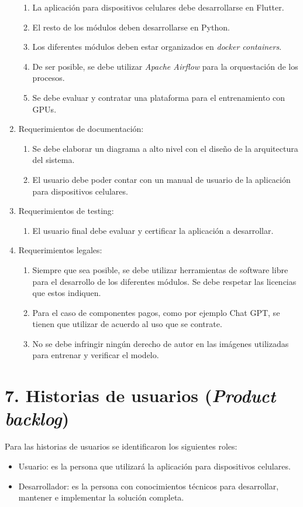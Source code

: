 \documentclass[
11pt, %
]{charter}
\begin{document}
\begin{enumerate}
\begin{enumerate}
			\item La aplicación para dispositivos celulares debe desarrollarse en Flutter.
			\item El resto de los módulos deben desarrollarse en Python.
			\item Los diferentes módulos deben estar organizados en \textit{docker containers}.
			\item De ser posible, se debe utilizar \textit{Apache Airflow} para la orquestación de los procesos.
			\item Se debe evaluar y contratar una plataforma para el entrenamiento con GPUs.
		\end{enumerate}
	\item Requerimientos de documentación:
		\begin{enumerate}
			\item Se debe elaborar un diagrama a alto nivel con el diseño de la arquitectura del sistema.
			\item El usuario debe poder contar con un manual de usuario de la aplicación para dispositivos celulares.
		\end{enumerate}
	\item Requerimientos de testing:
		\begin{enumerate}
			\item El usuario final debe evaluar y certificar la aplicación a desarrollar.
		\end{enumerate}
	\item Requerimientos legales:
		\begin{enumerate}
			\item Siempre que sea posible, se debe utilizar herramientas de software libre para el desarrollo de los diferentes módulos. Se debe respetar las licencias que estos indiquen.
			\item Para el caso de componentes pagos, como por ejemplo Chat GPT, se tienen que utilizar de acuerdo al uso que se contrate.
			\item No se debe infringir ningún derecho de autor en las imágenes utilizadas para entrenar y verificar el modelo.
		\end{enumerate}
\end{enumerate}


\section{7. Historias de usuarios (\textit{Product backlog})}
\label{sec:backlog}

Para las historias de usuarios se identificaron los siguientes roles:
\begin{itemize}
\item Usuario: es la persona que utilizará la aplicación para dispositivos celulares.
\item Desarrollador: es la persona con conocimientos técnicos para desarrollar, mantener e implementar la solución completa. 
\end{itemize}
\end{document}
